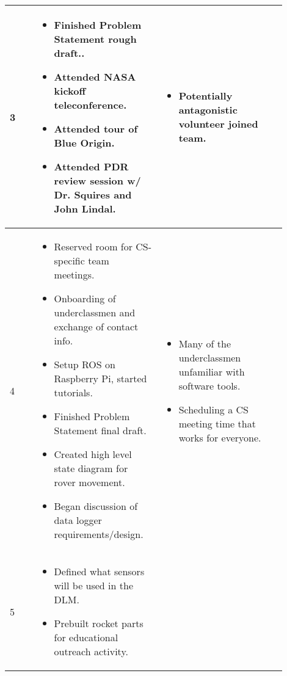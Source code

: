 \documentclass[onecolumn, draftclsnofoot,10pt, compsoc]{IEEEtran}
\newenvironment{myitemize}
{ \begin{itemize}
    \setlength{\itemsep}{0pt}
    \setlength{\parskip}{0pt}
    \setlength{\parsep}{0pt}     }
{ \end{itemize}                  }
\begin{document}
\begin{singlespacing}
\begin{tabular} {l p{0.45\linewidth} p{0.45\linewidth}}
3 &
\vspace{-\baselineskip}\begin{myitemize}
\item Finished Problem Statement rough draft..
\item Attended NASA kickoff teleconference.
\item Attended tour of Blue Origin.
\item Attended PDR review session w/ Dr. Squires and John Lindal.
\vspace{-\baselineskip}\end{myitemize} & 
\vspace{-\baselineskip}\begin{myitemize}
\item Potentially antagonistic volunteer joined team.
\vspace{-\baselineskip}\end{myitemize} \\\hline
4 & 
\vspace{-\baselineskip}\begin{myitemize}
\item Reserved room for CS-specific team meetings.
\item Onboarding of underclassmen and exchange of contact info.
\item Setup ROS on Raspberry Pi, started tutorials.
\item Finished Problem Statement final draft.
\item Created high level state diagram for rover movement.
\item Began discussion of data logger requirements/design.
\vspace{-\baselineskip}\end{myitemize} & 
\vspace{-\baselineskip}\begin{myitemize}
\item Many of the underclassmen unfamiliar with software tools.
\item Scheduling a CS meeting time that works for everyone.
\vspace{-\baselineskip}\end{myitemize} \\\hline
5 &
\vspace{-\baselineskip}\begin{myitemize}
\item Defined what sensors will be used in the DLM.
\item Prebuilt rocket parts for educational outreach activity.

\end{myitemize}
\end{tabular}
\end{singlespacing}
\end{document}
